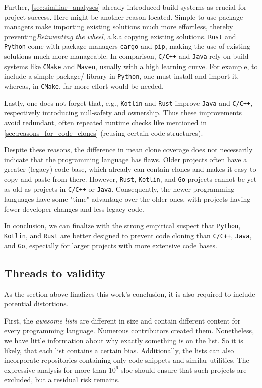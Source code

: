 Further, \autoref{sec:similiar_analyses} already introduced build systems as crucial for project success. Here might be another reason located. Simple to use package managers make importing existing solutions much more effortless, thereby preventing\textit{Reinventing the wheel}, a.k.a copying existing solutions. \texttt{Rust} and \texttt{Python} come with package managers \texttt{cargo} and \texttt{pip}, making the use of existing solutions much more manageable. In comparison, \texttt{C/C++} and \texttt{Java} rely on build systems like \texttt{CMake} and \texttt{Maven}, usually with a high learning curve. For example, to include a simple package/ library in \texttt{Python}, one must install and import it, whereas, in \texttt{CMake}, far more effort would be needed.

Lastly, one does not forget that, e.g., \texttt{Kotlin} and \texttt{Rust} improve \texttt{Java} and \texttt{C/C++}, respectively introducing null-safety and ownership. Thus these improvements avoid redundant, often repeated runtime checks like mentioned in \autoref{sec:reasons_for_code_clones} (reusing certain code structures).

Despite these reasons, the difference in mean clone coverage does not necessarily indicate that the programming language has flaws.
Older projects often have a greater (legacy) code base, which already can contain clones and makes it easy to copy and paste from there. 
However, \texttt{Rust}, \texttt{Kotlin}, and \texttt{Go} projects cannot be yet as old as projects in \texttt{C/C++} or \texttt{Java}. Consequently, the newer programming languages have some "time" advantage over the older ones, with projects having fewer developer changes and less legacy code.

In conclusion, we can finalize with the strong empirical suspect that \texttt{Python}, \texttt{Kotlin}, and \texttt{Rust} are better designed to prevent code cloning than \texttt{C/C++}, \texttt{Java}, and \texttt{Go}, especially for larger projects with more extensive code bases.

 
\subsection{Threads to validity}

As the section above finalizes this work's conclusion, it is also required to include potential distortions.

First, the \textit{awesome lists} are different in size and contain different content for every programming language. Numerous contributors created them. Nonetheless, we have little information about why exactly something is on the list. So it is likely, that each list contains a certain bias. Additionally, the lists can also incorporate repositories containing only code snippets and similar utilities. The expressive analysis for more than $10^6$ \ac{sloc} should ensure that such projects are excluded, but a residual risk remains.

